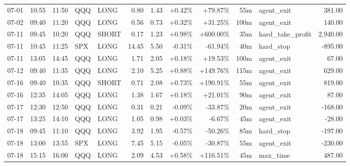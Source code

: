 \documentclass[11pt,a4paper,twoside]{article}
\begin{document}
\begin{center}
\begin{longtable}{>{\color{txtmain}}l l l l l r r r r r >{\color{txtmain}}l r}
07-01 & 10:55 & 11:50 & QQQ & LONG & 0.80 & 1.43 & \textcolor{wingreen}{+0.42\%} & \textcolor{wingreen}{+79.87\%} & 55m & agent\_exit & \textcolor{wingreen}{381.00} \\
07-02 & 09:40 & 11:20 & QQQ & LONG & 0.56 & 0.73 & \textcolor{wingreen}{+0.32\%} & \textcolor{wingreen}{+31.25\%} & 100m & agent\_exit & \textcolor{wingreen}{140.00} \\
07-11 & 09:45 & 10:20 & QQQ & SHORT & 0.17 & 1.23 & \textcolor{wingreen}{+0.98\%} & \textcolor{wingreen}{+600.00\%} & 35m & hard\_take\_profit & \textcolor{wingreen}{2,940.00} \\
07-11 & 10:45 & 11:25 & SPX & LONG & 14.45 & 5.50 & \textcolor{lossred}{-0.31\%} & \textcolor{lossred}{-61.94\%} & 40m & hard\_stop & \textcolor{lossred}{-895.00} \\
07-11 & 13:05 & 14:45 & QQQ & LONG & 1.71 & 2.05 & \textcolor{wingreen}{+0.18\%} & \textcolor{wingreen}{+19.53\%} & 100m & agent\_exit & \textcolor{wingreen}{67.00} \\
07-12 & 09:40 & 11:35 & QQQ & LONG & 2.10 & 5.25 & \textcolor{wingreen}{+0.88\%} & \textcolor{wingreen}{+149.76\%} & 115m & agent\_exit & \textcolor{wingreen}{629.00} \\
07-16 & 09:40 & 10:35 & QQQ & SHORT & 0.71 & 2.08 & \textcolor{wingreen}{+0.73\%} & \textcolor{wingreen}{+190.91\%} & 55m & agent\_exit & \textcolor{wingreen}{819.00} \\
07-16 & 12:35 & 14:05 & QQQ & LONG & 1.38 & 1.67 & \textcolor{wingreen}{+0.18\%} & \textcolor{wingreen}{+21.01\%} & 90m & agent\_exit & \textcolor{wingreen}{87.00} \\
07-17 & 12:30 & 12:50 & QQQ & LONG & 0.31 & 0.21 & \textcolor{lossred}{-0.09\%} & \textcolor{lossred}{-33.87\%} & 20m & agent\_exit & \textcolor{lossred}{-168.00} \\
07-17 & 13:25 & 14:10 & QQQ & LONG & 1.05 & 0.98 & \textcolor{wingreen}{+0.03\%} & \textcolor{lossred}{-6.67\%} & 45m & agent\_exit & \textcolor{lossred}{-28.00} \\
07-18 & 09:45 & 11:10 & QQQ & LONG & 3.92 & 1.95 & \textcolor{lossred}{-0.57\%} & \textcolor{lossred}{-50.26\%} & 85m & hard\_stop & \textcolor{lossred}{-197.00} \\
07-18 & 13:00 & 13:55 & SPX & LONG & 7.45 & 5.15 & \textcolor{lossred}{-0.05\%} & \textcolor{lossred}{-30.87\%} & 55m & agent\_exit & \textcolor{lossred}{-230.00} \\
07-18 & 15:15 & 16:00 & QQQ & LONG & 2.09 & 4.53 & \textcolor{wingreen}{+0.58\%} & \textcolor{wingreen}{+116.51\%} & 45m & max\_time & \textcolor{wingreen}{487.00} \\

\end{longtable}
\end{center}
\end{document}
